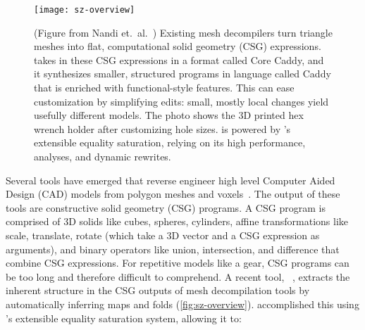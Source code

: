 \begin{figure}
  \centering
  \texttt{[image: sz-overview]}
  \caption[Szalinski decompiles flat CSG into structured CAD]{
  (Figure from Nandi et.\ al.\ \cite{szalinski})
  Existing mesh decompilers turn
    triangle meshes into flat, computational solid geometry (CSG) expressions.
  \sz~\cite{szalinski} takes in these CSG expressions
    in a format called Core Caddy,
    and it synthesizes smaller, structured programs in language called Caddy
    that is enriched with functional-style features.
  This can ease customization by simplifying edits:
    small, mostly local changes
    yield usefully different models.
  The photo shows the 3D printed hex wrench holder after
    customizing hole sizes.
  \sz is powered by \egg's extensible equality saturation, relying on its high
    performance, \eclass analyses, and dynamic rewrites.
  }
  \label{fig:sz-overview}
\end{figure}

Several tools have emerged
  that reverse engineer high level
  Computer Aided Design (CAD) models from polygon
  meshes and voxels~\cite{reincarnate, inverse, shape, csgnet, latex}.
The output of these tools are constructive solid geometry (CSG) programs.
A CSG program is comprised of
  3D solids like cubes, spheres, cylinders,
  affine transformations like scale, translate, rotate
  (which take a 3D vector and a CSG expression as arguments),
  and binary operators like union, intersection, and difference
  that combine CSG expressions.
For repetitive models like a gear, CSG programs can be too long
  and therefore difficult to comprehend.
A recent tool, \sz~\cite{szalinski},
  extracts the inherent structure
  in the CSG outputs of mesh decompilation tools
  by automatically inferring maps and folds (\autoref{fig:sz-overview}).
\sz accomplished this using \egg's extensible equality saturation system,
  allowing it to:

